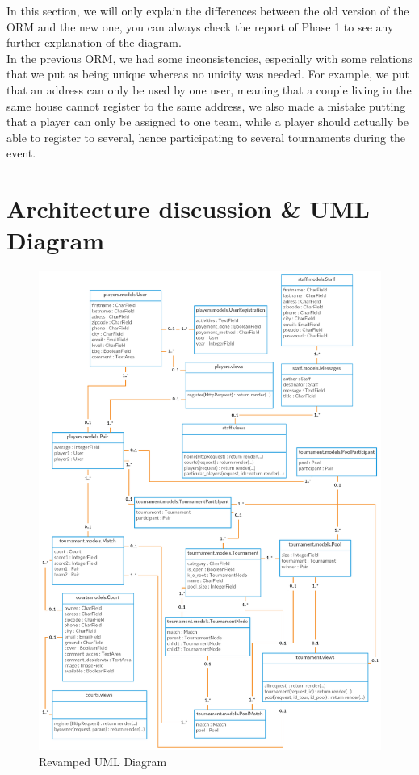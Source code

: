 \documentclass[a4paper, 12pt]{article}
\begin{document}
In this section, we will only explain the differences between the old version of the ORM and the new one, you can always check the report of Phase 1 to see any further explanation of the diagram. \\

In the previous ORM, we had some inconsistencies, especially with some relations that we put as being unique whereas no unicity was needed. For example, we put that an address can only be used by one user, meaning that a couple living in the same house cannot register to the same address, we also made a mistake putting that a player can only be assigned to one team, while a player should actually be able to register to several, hence participating to several tournaments during the event.
 
\newpage
\section{Architecture discussion \& UML Diagram}

\begin{figure}[h]
\caption{\label{uml2} Revamped UML Diagram}
\includegraphics[scale=0.6]{UMLp2.PNG}
\end{figure}
\end{document}
